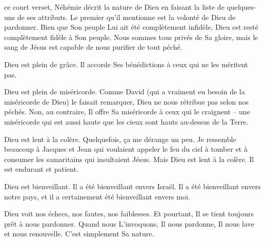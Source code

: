  ce court verset, Néhémie décrit la nature de Dieu
 en faisant la liste de quelques-uns de ses attributs.
 Le premier qu'il mentionne est la volonté de Dieu de pardonner.
 Bien que Son peuple Lui ait été complètement infidèle,
 Dieu est resté complètement fidèle à Son peuple.
 Nous sommes tous privés de Sa gloire,
 mais le sang de Jésus est capable de nous purifier de tout péché.


Dieu est plein de grâce.
 Il accorde Ses bénédictions à ceux qui ne les méritent pas.

Dieu est plein de miséricorde.
 Comme David (qui a vraiment eu besoin de la miséricorde de Dieu)
 le faisait remarquer, Dieu ne nous rétribue pas selon nos péchés.
 Non, au contraire, Il offre Sa miséricorde à ceux qui le craignent --
 une miséricorde qui est aussi haute que les cieux sont hauts
 au-dessus de la Terre.

Dieu est lent à la colère. Quelquefois, ça me dérange un peu.
 Je ressemble beaucoup à Jacques et Jean qui voulaient appeler
 le feu du ciel à tomber et à consumer les samaritains qui insultaient Jésus.
 Mais Dieu est lent à la colère. Il est endurant et patient.

Dieu est bienveillant. Il a été bienveillant envers Israël.
 Il a été bienveillant envers notre pays,
 et il a certainement été bienveillant envers moi.

Dieu voit nos échecs, nos fautes, nos faiblesses.
 Et pourtant, Il se tient toujours prêt à nous pardonner.
 Quand nous L'invoquons, Il nous pardonne,
 Il nous lave et nous renouvelle. C'est simplement Sa nature.

\dvrule



